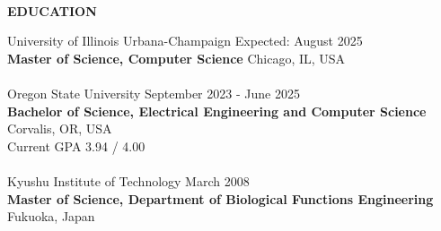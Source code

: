 \begin{flushleft}
	\hrulefill \\
	\begin{large}
		\begin{center}\textbf{EDUCATION}\end{center}
	\end{large}
\end{flushleft}
University of Illinois Urbana-Champaign \hfill Expected: August 2025 \\
\textbf{Master of Science, Computer Science}  \hfill Chicago, IL, USA\\
\\
Oregon State University \hfill September 2023 - June 2025 \\
\textbf{Bachelor of Science, Electrical Engineering and Computer Science}  \hfill Corvalis, OR, USA\\
Current GPA 3.94 / 4.00\\
\\
Kyushu Institute of Technology \hfill March 2008\\
\textbf{Master of Science, Department of Biological Functions Engineering} \hfill Fukuoka, Japan\\

